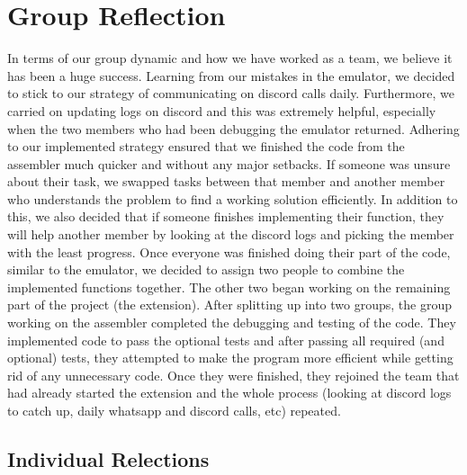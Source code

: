 \documentclass[10pt]{article}
\begin{document}
\section{Group Reflection}
In terms of our group dynamic and how we have worked as a team, we believe it has been a huge success. Learning from our mistakes in the emulator, we decided to stick to our strategy of communicating on discord calls daily. Furthermore, we carried on updating logs on discord and this was extremely helpful, especially when the two members who had been debugging the emulator returned. Adhering to our implemented strategy ensured that we finished the code from the assembler much quicker and without any major setbacks. If someone was unsure about their task, we swapped tasks between that member and another member who understands the problem to find a working solution efficiently. In addition to this, we also decided that if someone finishes implementing their function, they will help another member by looking at the discord logs and picking the member with the least progress. Once everyone was finished doing their part of the code, similar to the emulator, we decided to assign two people to combine the implemented functions together. The other two began working on the remaining part of the project (the extension). After splitting up into two groups, the group working on the assembler completed the debugging and testing of the code. They implemented code to pass the optional tests and after passing all required (and optional) tests, they attempted to make the program more efficient while getting rid of any unnecessary code. Once they were finished, they rejoined the team that had already started the extension and the whole process (looking at discord logs to catch up, daily whatsapp and discord calls, etc) repeated.

\subsection{Individual Relections}
\end{document}
